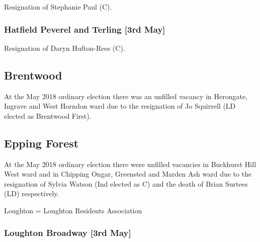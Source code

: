 \documentclass[a4paper,openany]{book}
\begin{document}
\begin{resultsiii}

Resignation of Stephanie Paul (C).

\subsubsection*{Hatfield Peverel and Terling \hspace*{\fill}\nolinebreak[1]%
\enspace\hspace*{\fill}
[3rd May]}


Resignation of Daryn Hufton-Rees (C).

\subsection*{Brentwood}

At the May 2018 ordinary election there was an unfilled vacancy in Herongate, Ingrave and West Horndon ward due to the resignation of Jo Squirrell (LD elected as Brentwood First).

\subsection*{Epping Forest}

At the May 2018 ordinary election there were unfilled vacancies in Buckhurst Hill West ward and in Chipping Ongar, Greensted and Marden Ash ward due to the resignation of Sylvia Watson (Ind elected as C) and the death of Brian Surtees (LD) respectively.

Loughton = Loughton Residents Association

\subsubsection*{Loughton Broadway \hspace*{\fill}\nolinebreak[1]%
\enspace\hspace*{\fill}
[3rd May]}



\end{resultsiii}
\end{document}
